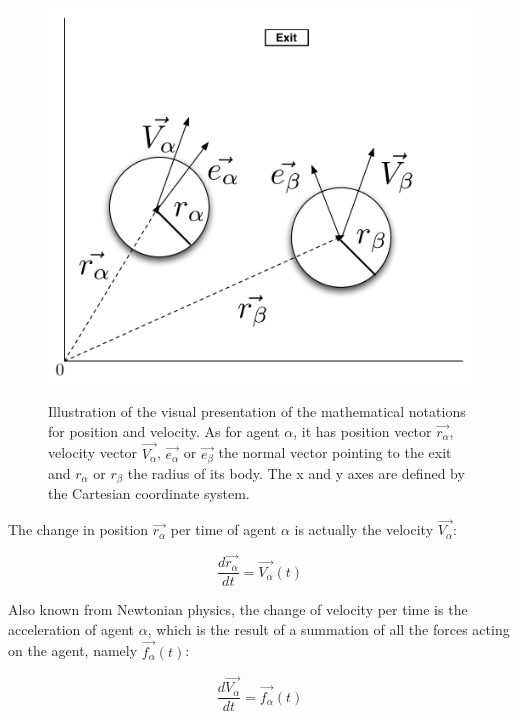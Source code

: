 \begin{figure}[hb]
    \centering
    {\includegraphics[scale=0.35]{Figures/NotationOfAgent.pdf}} 
    \caption[Notation of an agent]{Illustration of the visual presentation of the mathematical notations for position and velocity. As for agent $ \alpha $,
	    it has position vector $ \vec{r_{\alpha}} $, velocity vector $ \vec{V_{\alpha}} $, $\vec{e_{\alpha}}$ or $\vec{e_{\beta}}$ the normal vector pointing
	    to the exit and  $ r_{\alpha} $ or  $ r_{\beta} $ the radius of its body.
	    The x and y axes are defined by the Cartesian coordinate system.}
    \label{NotationOfAgent}
\end{figure}

The change in position $ \vec{r_{\alpha}} $ per time of 
agent $\alpha$ is actually the velocity $ \vec{V_{\alpha}} $:

\begin{equation}
		\frac{d \vec{r_{\alpha}}}{dt} = \vec{V_{\alpha}} \left( t \right)
\end{equation}

Also known from Newtonian physics, the change of velocity per time is the acceleration of agent 
$\alpha$, which is the result of a summation of all the forces acting on the agent, namely 
$\vec{f_{\alpha}} \left( t \right)$:

\begin{equation}
    \frac{d \vec{V_{\alpha}}}{dt} = \vec{f_{\alpha}} \left( t \right) 
\end{equation}

